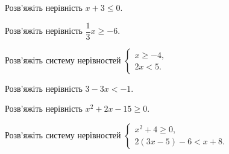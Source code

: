 \documentclass[12pt]{article}
\begin{document}
\begin{samepage}
\noindent\zadnum Розв'яжіть нерівність $x + 3 \leqslant 0$. 

\nmtnobreak
\answerTable{$(-3; +\infty)$}{$(-\infty; -3]$}{$(-\infty; 3]$}{$[-3; +\infty)$}{$(-\infty; -3)$}
\par{}
\end{samepage}

\begin{samepage}
\noindent\zadnum Розв'яжіть нерівність $\dfrac{1}{3}x \geqslant -6$. 

\nmtnobreak
\answerTableTall{$[-2; +\infty)$}{$(-\infty; -2]$}{$[-18; +\infty)$}{$\left[-\dfrac{1}{18}; +\infty\right)$}{$(-\infty; -18]$}
\par{}
\end{samepage}

\begin{samepage}
\noindent\zadnum Розв'яжіть систему нерівностей $\begin{cases} x \geqslant -4, \\ 2x < 5. \end{cases}$ 

\nmtnobreak
\answerTable{$(2{,}5; +\infty)$}{$[-4; 2{,}5)$}{$(-\infty; 2{,}5)$}{$[-4; +\infty)$}{$(-\infty; -4]$}
\par{}
\end{samepage}

\begin{samepage}
\noindent\zadnum Розв'яжіть нерівність $3 - 3x < -1$. 

\nmtnobreak
{}
\par{}
\end{samepage}

\begin{samepage}
\noindent\zadnum Розв'яжіть нерівність $x^2 + 2x - 15 \geqslant 0$. 
\nmtOptions{$(-\infty; -5] \cup [3; +\infty)$}{$[-5; 3]$}{$[3; +\infty)$}{$(-\infty; -3] \cup [5; +\infty)$}{$[-3; 5]$}
\par{}\vspace{0.25cm}
\end{samepage}

\begin{samepage}
\noindent\zadnum Розв'яжіть систему нерівностей $\begin{cases} x^2 + 4 \geqslant 0, \\ 2(3x - 5) - 6 < x + 8. \end{cases}$ 
\nmtOptions{$(-\infty; -2] \cup [2; 4{,}8)$}{$(-\infty; 4{,}8)$}{$(-\infty; 2]$}{$[2; 4{,}8)$}{$(-\infty; -2]$}
\par{}\vspace{0.25cm}
\end{samepage}
\end{document}
